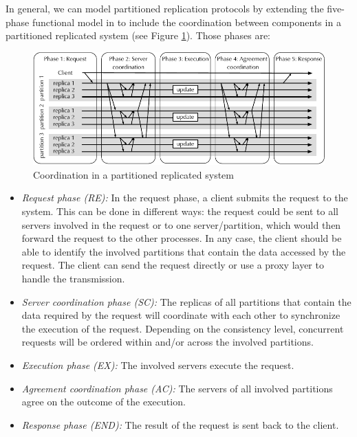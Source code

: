 

In general, we can model partitioned replication protocols by
extending the five-phase functional model in \cite{wiesmann2000understanding} to
include the coordination between components in a partitioned replicated system
(see Figure \ref{fig:replication:coordination}). Those phases are:


\begin{figure}[ht!]
  \begin{minipage}[b]{1.0\linewidth}
  \centering
        \includegraphics[width=1\linewidth]{figures/replication-coordination}
  \end{minipage}
  \caption{Coordination in a partitioned replicated system}
  \label{fig:replication:coordination}
\end{figure}

\begin{itemize}
  \item \textit{Request phase (RE):} In the request phase, a client submits the request
     to the system. This can be done in different ways: the request could
  be sent to all servers involved in the request or to one server/partition, which would
  then forward the request to the other processes. In any case, the client should
  be able to identify the involved partitions that contain the data accessed by
  the request. The client can send the request directly or use a proxy layer to
  handle the transmission.
  \item \textit{Server coordination phase (SC):} The replicas of all partitions
  that contain the data required by the request will coordinate with each other
  to synchronize the execution of the request. Depending on the consistency level,  
  concurrent requests will be ordered within and/or across the involved partitions.
  \item \textit{Execution phase (EX):} The involved servers execute the request.
  \item \textit{Agreement coordination phase (AC):} The servers of all involved
  partitions agree on the outcome of the execution.
  \item \textit{Response phase (END):} The result of the request is sent back to the client.
\end{itemize}

